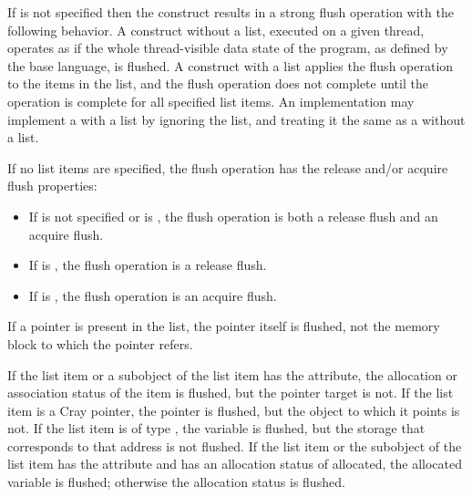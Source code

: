 \descr
If  is not specified then the  construct
results in a strong flush operation with the following behavior. A 
construct without a list, executed on a given thread, operates as if the whole
thread-visible data state of the program, as defined by the base language, is
flushed. A  construct with a list applies the flush operation to
the items in the list, and the flush operation does not complete until the
operation is complete for all specified list items. An implementation may
implement a  with a list by ignoring the list, and treating it the
same as a  without a list.

If no list items are specified, the flush operation has the release and/or
acquire flush properties:

\begin{itemize}
\item If  is not specified or is , the 
      flush operation is both a release flush and an acquire flush.
\item If  is , the flush operation is a 
      release flush.
\item If  is , the flush operation is an 
      acquire flush.
\end{itemize}

\begin{ccppspecific}
If a pointer is present in the list, the pointer itself is flushed, not the 
memory block to which the pointer refers.
\end{ccppspecific}

\begin{fortranspecific}
If the list item or a subobject of the list item has the  attribute, 
the allocation or association status of the  item is flushed, but 
the pointer target is not. If the list item is a Cray pointer, the pointer is 
flushed, but the object to which it points is not. If the list item is of type 
, the variable is flushed, but the storage that corresponds to that 
address is not flushed. If the list item or the subobject of the list item has the
 attribute and has an allocation status of allocated, the
allocated variable is flushed; otherwise the allocation status is flushed.
\end{fortranspecific}

